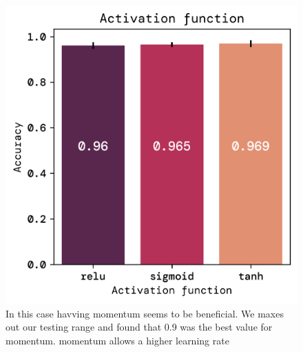 \documentclass[twoside,11pt]{report}
\begin{document}
    \begin{figure}[!ht]
        \begin{minipage}[t]{0.5\textwidth - 1mm}
            \begin{center}
                \includegraphics[width=\textwidth]{../runsAndFigures/accuracy_activ.png}
            \end{center}
            \caption
            {
                In this case havving momentum seems to be beneficial. We maxes out our testing range and 
                found that 0.9 was the best value for momentum. momentum allows a higher learning rate
            }\label{fig:accuracy_optimizer}
        \end{minipage}
        \hspace{2mm}
        \begin{minipage}[t]{0.5\textwidth - 1mm}
            \begin{center}

\end{center}
\end{minipage}
\end{figure}
\end{document}
